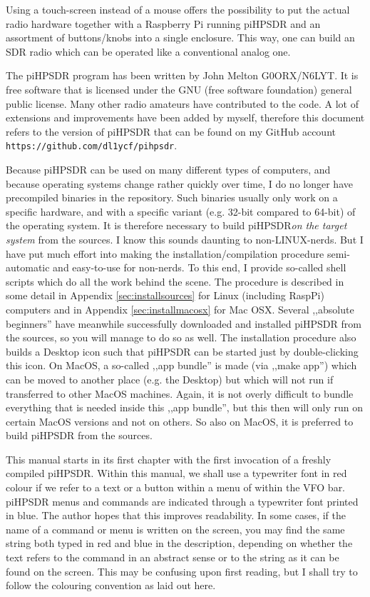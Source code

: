 \documentclass[12pt]{book}
\def\pH{pi\-HPSDR\xspace}
\begin{document}
Using a touch-screen instead of a mouse offers the possibility to put the actual radio hardware together
with a Raspberry Pi running \pH and an assortment of buttons/knobs into a single enclosure. This way,
one can build an SDR radio which can be operated like a conventional analog one.

The \pH program has been written by John Melton G0ORX/N6LYT. It is free software that is licensed under
the GNU (free software foundation) general public license. Many other radio amateurs have contributed to
the code. A lot of extensions and improvements have been added by myself, therefore this document refers
to the version of \pH that can be found on my GitHub account \texttt{https://github.com/dl1ycf/pihpsdr}.

Because \pH can be used on many different types of computers, and because operating systems change
rather quickly over time, I do no longer have precompiled binaries in the repository. Such binaries
usually only work on a specific hardware, and with a specific variant (e.g. 32-bit compared to 64-bit) of
the operating system. It is therefore necessary to build \pH \textit{on the target system}
from the sources. I know this sounds daunting to non-LINUX-nerds. But I have put much effort into making
the installation/compilation procedure semi-automatic and easy-to-use for non-nerds.
To this end, I provide so-called shell scripts which do all the work behind the scene.
The procedure is described in some detail in Appendix \ref{sec:installsources} for Linux (including RaspPi)
computers and in Appendix \ref{sec:installmacosx} for Mac OSX. Several ,,absolute beginners'' have meanwhile
successfully downloaded and installed \pH from the sources, so you will manage to do so as well.
The installation procedure also builds a Desktop icon such that \pH can be started just by double-clicking
this icon.
On MacOS,
a so-called ,,app bundle'' is made (via ,,make app'') which can be moved to another place (e.g. the Desktop)
but which will not run if transferred to other MacOS machines. Again, it is not overly difficult
to bundle everything that is needed inside this ,,app bundle'', but this then will only run on certain
MacOS versions and not on others. So also on MacOS, it is preferred to build \pH from the sources.

This manual starts in its first chapter with the first invocation of a freshly compiled \pH.
Within this manual, we shall use a typewriter font in red colour if we refer to a text or a button within
a menu of within the VFO bar. \pH menus and commands are indicated through a typewriter font
printed in blue. The author hopes that this improves readability. In some cases, if the name of a command
or  menu is written on the screen, you may find the same string both typed in red and blue in the
description, depending on whether the text refers to the command in an abstract sense or to the string as it
can be found on the screen. This may be confusing upon first reading, but I shall try to follow the colouring
 convention as laid out here.
\end{document}
